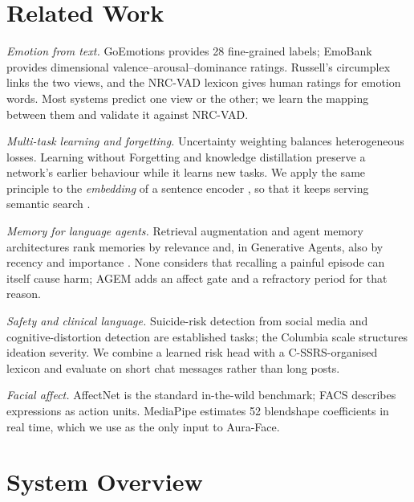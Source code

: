 \documentclass[conference]{IEEEtran}
\begin{document}
\section{Related Work}

\textit{Emotion from text.} GoEmotions \cite{demszky2020} provides 28 fine-grained labels; EmoBank \cite{buechel2017} provides dimensional valence--arousal--dominance ratings. Russell's circumplex \cite{russell1980} links the two views, and the NRC-VAD lexicon \cite{mohammad2018} gives human ratings for emotion words. Most systems predict one view or the other; we learn the mapping between them and validate it against NRC-VAD.

\textit{Multi-task learning and forgetting.} Uncertainty weighting \cite{kendall2018} balances heterogeneous losses. Learning without Forgetting \cite{li2018lwf} and knowledge distillation \cite{hinton2015} preserve a network's earlier behaviour while it learns new tasks. We apply the same principle to the \emph{embedding} of a sentence encoder \cite{reimers2019,wang2020minilm}, so that it keeps serving semantic search \cite{cer2017sts}.

\textit{Memory for language agents.} Retrieval augmentation \cite{lewis2020rag} and agent memory architectures \cite{park2023,packer2023} rank memories by relevance and, in Generative Agents, also by recency and importance \cite{park2023}. None considers that recalling a painful episode can itself cause harm; AGEM adds an affect gate and a refractory period for that reason.

\textit{Safety and clinical language.} Suicide-risk detection from social media \cite{coppersmith2018,komati2021} and cognitive-distortion detection \cite{shreevastava2021,beck1979} are established tasks; the Columbia scale \cite{posner2011} structures ideation severity. We combine a learned risk head with a C-SSRS-organised lexicon and evaluate on short chat messages rather than long posts.

\textit{Facial affect.} AffectNet \cite{mollahosseini2019} is the standard in-the-wild benchmark; FACS \cite{ekman1978} describes expressions as action units. MediaPipe \cite{lugaresi2019,kartynnik2019} estimates 52 blendshape coefficients in real time, which we use as the only input to Aura-Face.

\section{System Overview}
\end{document}
